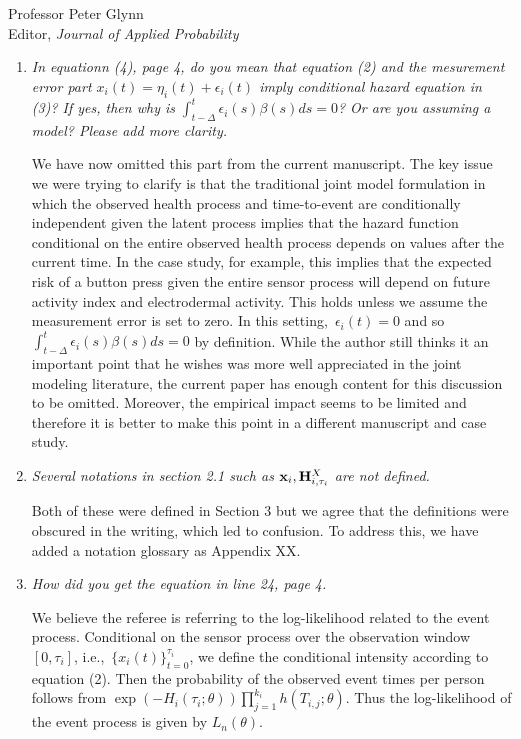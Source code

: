 \documentclass[11pt]{letter} %
\begin{document}
\begin{letter}{Professor
	Peter Glynn\\
	Editor, {\em Journal of Applied Probability}}
\begin{enumerate}
\item {\it In equationn (4), page 4, do you mean that equation (2) and the mesurement error part $x_i (t) = \eta_i (t) + \epsilon_i (t)$ imply conditional hazard equation in (3)?  If yes, then why is $\int_{t-\Delta}^t \epsilon_i (s) \beta(s) ds = 0$?  Or are you assuming a model?  Please add more clarity.}

\vspace{5mm}
We have now omitted this part from the current manuscript. The key issue we were trying to clarify is that the traditional joint model formulation in which the observed health process and time-to-event are conditionally independent given the latent process implies that the hazard function conditional on the entire observed health process depends on values after the current time.  In the case study, for example, this implies that the expected risk of a button press given the entire sensor process will depend on future activity index and electrodermal activity.  This holds unless we assume the measurement error is set to zero.  In this setting,~$\epsilon_i (t) = 0$ and so $\int_{t-\Delta}^t \epsilon_i (s) \beta(s)ds = 0$ by definition. While the author still thinks it an important point that he wishes was more well appreciated in the joint modeling literature, the current paper has enough content for this discussion to be omitted.  Moreover, the empirical impact seems to be limited and therefore it is better to make this point in a different manuscript and case study.
\vspace{5mm}

\item {\it Several notations in section 2.1 such as ${\bf x}_i, {\bf H}_{i,\tau_i}^X$ are not defined.}

\vspace{5mm}
Both of these were defined in Section 3 but we agree that the definitions were obscured in the writing, which led to confusion.  To address this, we have added a notation glossary as Appendix XX.
\vspace{5mm}

\item {\it How did you get the equation in line 24, page 4.}

\vspace{5mm}
We believe the referee is referring to the log-likelihood related to the event process.   Conditional on the sensor process over the observation window $[0,\tau_i]$, i.e.,~$\{ x_i (t) \}_{t=0}^{\tau_i}$, we define the conditional intensity according to equation (2).  Then the probability of the observed event times per person follows from $\exp \left( - H_i (\tau_i ; \theta) \right) \prod_{j=1}^{k_i} h \left(T_{i,j};\theta \right)$.  Thus the log-likelihood of the event process is given by $L_n (\theta)$.
\vspace{5mm}


\end{enumerate}
\end{letter}
\end{document}
